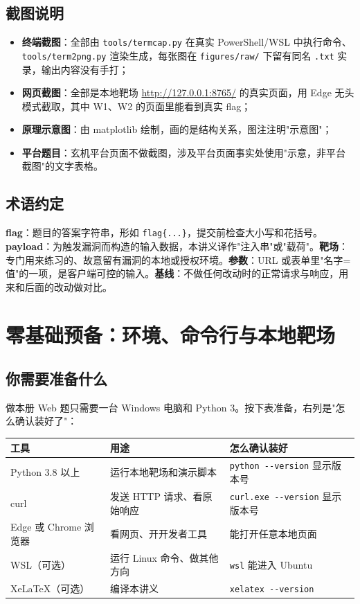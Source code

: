 \documentclass[UTF8,12pt,oneside]{ctexbook}
\begin{document}
\section*{截图说明}
\begin{itemize}
\item \textbf{终端截图}：全部由 \verb|tools/termcap.py| 在真实 PowerShell/WSL 中执行命令、\verb|tools/term2png.py| 渲染生成，每张图在 \verb|figures/raw/| 下留有同名 \verb|.txt| 实录，输出内容没有手打；
\item \textbf{网页截图}：全部是本地靶场 \url{http://127.0.0.1:8765/} 的真实页面，用 Edge 无头模式截取，其中 W1、W2 的页面里能看到真实 flag；
\item \textbf{原理示意图}：由 matplotlib 绘制，画的是结构关系，图注注明"示意图"；
\item \textbf{平台题目}：玄机平台页面不做截图，涉及平台页面事实处使用"示意，非平台截图"的文字表格。
\end{itemize}

\section*{术语约定}
\textbf{flag}：题目的答案字符串，形如 \verb|flag{...}|，提交前检查大小写和花括号。\textbf{payload}：为触发漏洞而构造的输入数据，本讲义译作"注入串"或"载荷"。\textbf{靶场}：专门用来练习的、故意留有漏洞的本地或授权环境。\textbf{参数}：URL 或表单里"名字=值"的一项，是客户端可控的输入。\textbf{基线}：不做任何改动时的正常请求与响应，用来和后面的改动做对比。

\tableofcontents
\mainmatter

\chapter{零基础预备：环境、命令行与本地靶场}
\label{web:prep}

\section{你需要准备什么}
做本册 Web 题只需要一台 Windows 电脑和 Python 3。按下表准备，右列是"怎么确认装好了"：
\begin{center}
\begin{tabular}{p{}p{}p{}}
\toprule
工具 & 用途 & 怎么确认装好 \\
\midrule
Python 3.8 以上 & 运行本地靶场和演示脚本 & \verb|python --version| 显示版本号 \\
curl & 发送 HTTP 请求、看原始响应 & \verb|curl.exe --version| 显示版本号 \\
Edge 或 Chrome 浏览器 & 看网页、开开发者工具 & 能打开任意本地页面 \\
WSL（可选）& 运行 Linux 命令、做其他方向 & \verb|wsl| 能进入 Ubuntu \\
XeLaTeX（可选）& 编译本讲义 & \verb|xelatex --version| \\
\bottomrule
\end{tabular}
\end{center}
\end{document}
